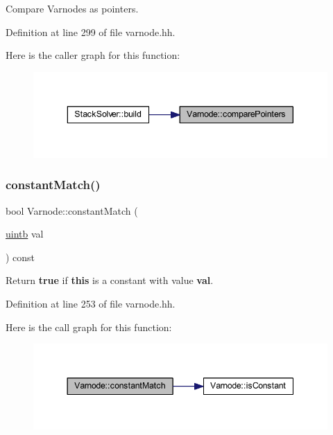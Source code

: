 Compare Varnodes as pointers. 



Definition at line 299 of file varnode.\+hh.

Here is the caller graph for this function\+:
\nopagebreak
\begin{figure}[H]
\begin{center}
\leavevmode
\includegraphics[width=343pt]{class_varnode_a5739fd0f16b4321090f1108a4c618229_icgraph}
\end{center}
\end{figure}
\mbox{\label{class_varnode_a74744382f6e164a333b06640517018fc}} 
\subsubsection{\texorpdfstring{constantMatch()}{constantMatch()}}
{\footnotesize\ttfamily bool Varnode\+::constant\+Match (\begin{DoxyParamCaption}\item[{\mbox{\hyperlink{types_8h_a2db313c5d32a12b01d26ac9b3bca178f}{uintb}}}]{val }\end{DoxyParamCaption}) const\hspace{0.3cm}{\ttfamily [inline]}}



Return {\bfseries{true}} if {\bfseries{this}} is a constant with value {\bfseries{val}}. 



Definition at line 253 of file varnode.\+hh.

Here is the call graph for this function\+:
\nopagebreak
\begin{figure}[H]
\begin{center}
\leavevmode
\includegraphics[width=344pt]{class_varnode_a74744382f6e164a333b06640517018fc_cgraph}
\end{center}
\end{figure}
\mbox{\label{class_varnode_afe43c9eba2e162f06ff29888db703d4d}} 

